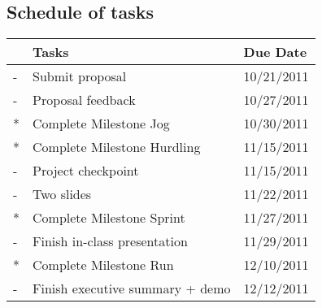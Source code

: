 \documentclass{article}
\begin{document}
\subsection{Schedule of tasks}
\begin{tabular}{|l|l|l|}
\hline
  & Tasks                             & Due Date   \\ \hline
- & Submit proposal                   & 10/21/2011 \\
- & Proposal feedback                 & 10/27/2011 \\
* & Complete Milestone Jog            & 10/30/2011 \\
* & Complete Milestone Hurdling       & 11/15/2011 \\
- & Project checkpoint                & 11/15/2011 \\
- & Two slides                        & 11/22/2011 \\
* & Complete Milestone Sprint         & 11/27/2011 \\
- & Finish in-class presentation      & 11/29/2011 \\
* & Complete Milestone Run            & 12/10/2011 \\
- & Finish executive summary + demo   & 12/12/2011 \\
\hline
\end{tabular}
\end{document}
